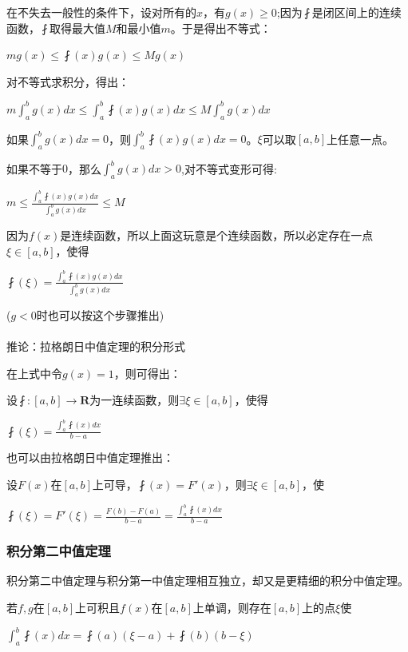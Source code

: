 \documentclass[UTF8]{ctexbook}
\newcommand{\defFunction}[1]{\fint(#1)}
\newcommand{\definiteIntegral}[2]{\int^{#1}_{#2}}
\begin{document}
{{{{在不失去一般性的条件下，设对所有的$x$，有$g(x) \geq 0$;因为$\fint$是闭区间上的连续函数，$\fint$取得最大值$M$和最小值$m$。于是得出不等式：

$mg(x) \leq \defFunction{x}g(x) \leq Mg(x)$

对不等式求积分，得出：

$m\definiteIntegral{b}{a}g(x)dx \leq \definiteIntegral{b}{a}\defFunction{x}g(x)dx \leq M\definiteIntegral{b}{a}g(x)dx$

如果$\definiteIntegral{b}{a}g(x)dx = 0$，则$\definiteIntegral{b}{a}\defFunction{x}g(x)dx = 0$。$\xi$可以取$[a,b]$上任意一点。

如果不等于$0$，那么$\definiteIntegral{b}{a}g(x)dx>0$,对不等式变形可得:

$m \leq \frac{\definiteIntegral{b}{a}\defFunction{x}g(x)dx}{\definiteIntegral{b}{a}g(x)dx} \leq M$

因为$f(x)$是连续函数，所以上面这玩意是个连续函数，所以必定存在一点$\xi\in[a,b]$，使得

$\defFunction{\xi} = \frac{\definiteIntegral{b}{a}\defFunction{x}g(x)dx}{\definiteIntegral{b}{a}g(x)dx}$

($g<0$时也可以按这个步骤推出)
\\\\
推论：拉格朗日中值定理的积分形式

在上式中令$g(x) = 1$，则可得出：

设$\fint : [a,b] \to \mathbf{R}$为一连续函数，则$\exists\xi\in[a,b]$，使得

$\defFunction{\xi} = \frac{\definiteIntegral{b}{a}\defFunction{x}dx}{b - a}$

也可以由拉格朗日中值定理推出：

设$F(x)$在$[a,b]$上可导，$\defFunction{x} = F\prime(x)$，则$\exists\xi\in[a,b]$，使

$\defFunction{\xi} = F\prime(\xi) = \frac{F(b) - F(a)}{b - a} = \frac{\definiteIntegral{b}{a}\defFunction{x}dx}{b - a}$

}%

\subsubsection{积分第二中值定理}{

积分第二中值定理与积分第一中值定理相互独立，却又是更精细的积分中值定理。

若$f,g$在$[a,b]$上可积且$f(x)$在$[a,b]$上单调，则存在$[a,b]$上的点$\xi$使

$\definiteIntegral{b}{a}\defFunction{x}dx = \defFunction{a}(\xi - a) + \defFunction{b}(b - \xi)$

}}}}
\end{document}
